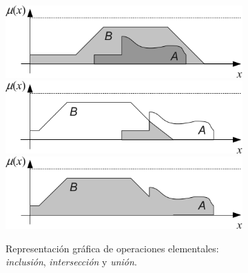\documentclass[10pt,a4paper]{article}
\begin{document}
\begin{figure}[ht!]
        \centering
        \begin{subfigure}[b]{0.4\textwidth}
                \centering
  \hbox{\includegraphics[width=\textwidth-\fboxrule-\fboxrule]{imgs/p2_g1.png}}
  \centering
  \hbox{\includegraphics[width=\textwidth-\fboxrule-\fboxrule]{imgs/p2_g2.png}}
  \centering
  \hbox{\includegraphics[width=\textwidth-\fboxrule-\fboxrule]{imgs/p2_g3.png}}
                \caption{Representación gráfica de operaciones elementales: \textit{inclusión}, \textit{intersección} y \textit{unión}.}
                \label{fig:p1_g}
        \end{subfigure}%
		\qquad \qquad
        \begin{subfigure}[b]{0.4\textwidth}
                \centering

\end{subfigure}
\end{figure}
\end{document}
